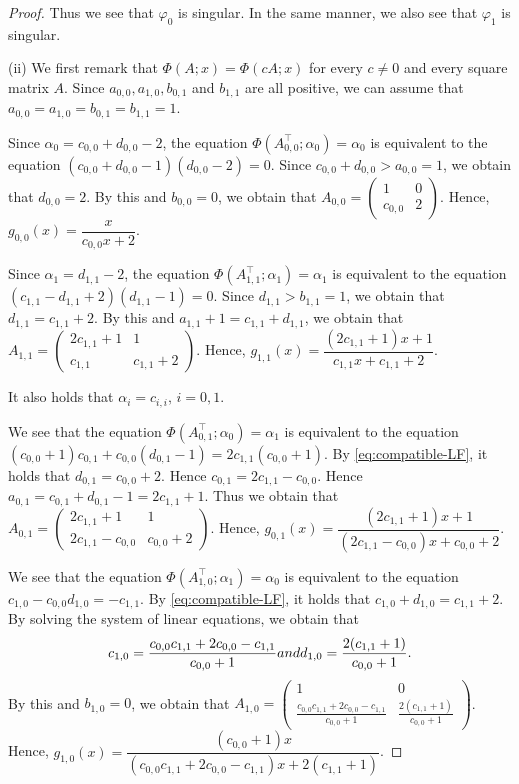 \documentclass[10pt,a4paper]{amsart}
\begin{document}
\begin{proof}
Thus we see that $\varphi_0$ is singular. 
In the same manner, we also see that $\varphi_1$ is singular. 

(ii) We first remark that $\Phi(A;x) = \Phi(cA;x)$ for every $c \ne 0$ and every square matrix $A$. 
Since $a_{0,0}, a_{1,0}, b_{0,1}$ and $b_{1,1}$ are all positive, 
we can assume that $a_{0,0} = a_{1,0} = b_{0,1} = b_{1,1} = 1$. 

Since $\alpha_0 = c_{0,0} + d_{0,0} - 2$, 
the equation $\Phi \left(A_{0,0}^{\top}; \alpha_0 \right) = \alpha_0$ is equivalent to  the equation $(c_{0,0} + d_{0,0} -1)(d_{0,0} - 2) = 0$. 
Since $c_{0,0} + d_{0,0} > a_{0,0} = 1$,  we obtain that $d_{0,0} = 2$. 
By this and $b_{0,0} = 0$, 
we obtain that 
$A_{0,0} = \begin{pmatrix} 1 & 0 \\ c_{0,0} & 2 \end{pmatrix}$.  
Hence, 
$g_{0,0}(x) = \dfrac{x}{c_{0,0} x + 2}$. 


Since $\alpha_1 =  d_{1,1} - 2$, 
the equation $\Phi \left(A_{1,1}^{\top}; \alpha_1 \right) = \alpha_1$ is equivalent to  the equation $(c_{1,1} - d_{1,1} + 2)(d_{1,1} - 1) = 0$. 
Since $d_{1,1} > b_{1,1} = 1$, we obtain that $d_{1,1} = c_{1,1} + 2$. 
By this and $a_{1,1} + 1 = c_{1,1} + d_{1,1}$, 
we obtain that 
$A_{1,1} = \begin{pmatrix} 2c_{1,1} + 1 & 1 \\ c_{1,1} & c_{1,1} + 2 \end{pmatrix}$.  
Hence, 
$g_{1,1}(x) = \dfrac{(2c_{1,1} + 1)x + 1}{c_{1,1} x + c_{1,1} + 2}$. 

It also holds that $\alpha_i = c_{i,i}, \, i = 0,1$. 


We see that the equation $\Phi \left(A_{0,1}^{\top}; \alpha_0 \right) = \alpha_1$ is equivalent to  the equation $(c_{0,0} + 1)c_{0,1} + c_{0,0} (d_{0,1} - 1) = 2c_{1,1} (c_{0,0} + 1)$. 
By \eqref{eq:compatible-LF}, 
it holds that $d_{0,1} = c_{0,0} + 2$.  
Hence $c_{0,1} = 2 c_{1,1} - c_{0,0}$. 
Hence $a_{0,1} = c_{0,1} + d_{0,1} - 1 = 2c_{1,1} + 1$. 
Thus we obtain that $A_{0,1} = \begin{pmatrix} 2c_{1,1} + 1 & 1 \\ 2c_{1,1} - c_{0,0} & c_{0,0} + 2 \end{pmatrix}$.  
Hence, 
$g_{0,1}(x) = \dfrac{(2c_{1,1} + 1)x + 1}{(2c_{1,1}-c_{0,0}) x + c_{0,0} + 2}$. 

We see that the equation $\Phi \left(A_{1,0}^{\top}; \alpha_1 \right) = \alpha_0$ is equivalent to  the equation $c_{1,0} - c_{0,0} d_{1,0} = -c_{1,1}$. 
By \eqref{eq:compatible-LF}, 
it holds that $c_{1,0} + d_{1,0} = c_{1,1} + 2$.  
By solving the system of linear equations, we obtain that 
\[ c_{1,0} = \frac{c_{0,0} c_{1,1} + 2 c_{0,0} - c_{1,1}}{c_{0,0} + 1} \textup{ and }  d_{1,0} = \frac{2(c_{1,1} + 1)}{c_{0,0} + 1}. \]
By this and $b_{1,0} = 0$, 
we obtain that 
$A_{1,0} = \begin{pmatrix} 1 & 0 \\  \frac{c_{0,0} c_{1,1} + 2 c_{0,0} - c_{1,1}}{c_{0,0} + 1}  & \frac{2(c_{1,1} + 1)}{c_{0,0} + 1} \end{pmatrix}$.  
Hence, 
$g_{1,0}(x) = \dfrac{(c_{0,0} + 1)x}{(c_{0,0} c_{1,1} + 2 c_{0,0} - c_{1,1}) x + 2(c_{1,1} + 1)}$. 


\end{proof}
\end{document}
